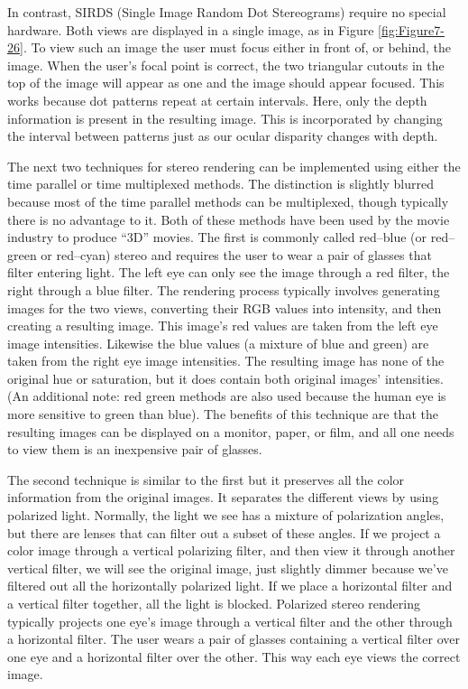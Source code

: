 In contrast, SIRDS (Single Image Random Dot Stereograms) require no special hardware. Both views are displayed in a single image, as in Figure \ref{fig:Figure7-26}. To view such an image the user must focus either in front of, or behind, the image. When the user's focal point is correct, the two triangular cutouts in the top of the image will appear as one and the image should appear focused. This works because dot patterns repeat at certain intervals. Here, only the depth information is present in the resulting image. This is incorporated by changing the interval between patterns just as our ocular disparity changes with depth.

The next two techniques for stereo rendering can be implemented using either the time parallel or time multiplexed methods. The distinction is slightly blurred because most of the time parallel methods can be multiplexed, though typically there is no advantage to it. Both of these methods have been used by the movie industry to produce ``3D'' movies. The first is commonly called red--blue (or red--green or red--cyan) stereo and requires the user to wear a pair of glasses that filter entering light. The left eye can only see the image through a red filter, the right through a blue filter. The rendering process typically involves generating images for the two views, converting their RGB values into intensity, and then creating a resulting image. This image's red values are taken from the left eye image intensities. Likewise the blue values (a mixture of blue and green) are taken from the right eye image intensities. The resulting image has none of the original hue or saturation, but it does contain both original images' intensities. (An additional note: red green methods are also used because the human eye is more sensitive to green than blue). The benefits of this technique are that the resulting images can be displayed on a monitor, paper, or film, and all one needs to view them is an inexpensive pair of glasses.

The second technique is similar to the first but it preserves all the color information from the original images. It separates the different views by using polarized light. Normally, the light we see has a mixture of polarization angles, but there are lenses that can filter out a subset of these angles. If we project a color image through a vertical polarizing filter, and then view it through another vertical filter, we will see the original image, just slightly dimmer because we've filtered out all the horizontally polarized light. If we place a horizontal filter and a vertical filter together, all the light is blocked. Polarized stereo rendering typically projects one eye's image through a vertical filter and the other through a horizontal filter. The user wears a pair of glasses containing a vertical filter over one eye and a horizontal filter over the other. This way each eye views the correct image.

